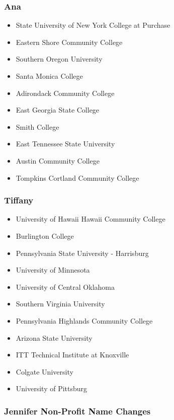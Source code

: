 \documentclass[
]{article}
\providecommand{\tightlist}{%
  \setlength{\itemsep}{0pt}\setlength{\parskip}{0pt}}
\begin{document}
\hypertarget{ana-1}{%
\subsubsection{Ana}\label{ana-1}}

\begin{itemize}
\tightlist
\item
  State University of New York College at Purchase
\item
  Eastern Shore Community College
\item
  Southern Oregon University
\item
  Santa Monica College
\item
  Adirondack Community College
\item
  East Georgia State College
\item
  Smith College
\item
  East Tennessee State University
\item
  Austin Community College
\item
  Tompkins Cortland Community College
\end{itemize}

\hypertarget{tiffany-1}{%
\subsubsection{Tiffany}\label{tiffany-1}}

\begin{itemize}
\tightlist
\item
  University of Hawaii Hawaii Community College
\item
  Burlington College
\item
  Pennsylvania State University - Harrisburg
\item
  University of Minnesota
\item
  University of Central Oklahoma
\item
  Southern Virginia University
\item
  Pennsylvania Highlands Community College
\item
  Arizona State University
\item
  ITT Technical Institute at Knoxville
\item
  Colgate University
\item
  University of Pittsburg
\end{itemize}

\hypertarget{jennifer-non-profit-name-changes}{%
\subsubsection{Jennifer Non-Profit Name
Changes}\label{jennifer-non-profit-name-changes}}
\end{document}
